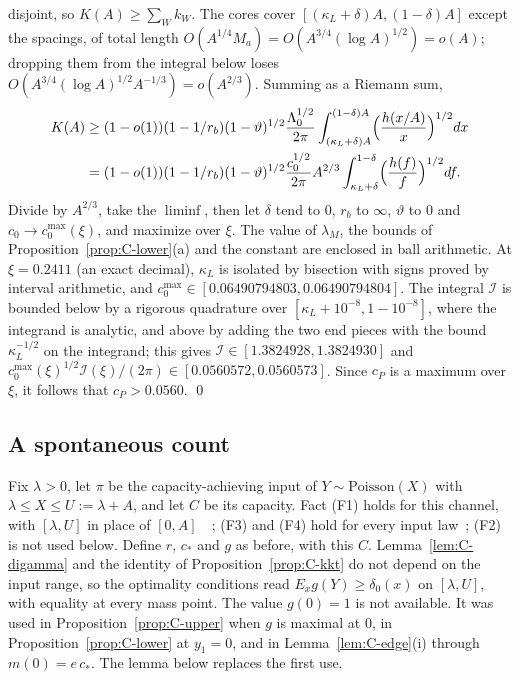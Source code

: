 \documentclass[10pt,letterpaper]{article}
\begin{document}
disjoint, so $K(A)\ge\sum_Wk_W$. The cores cover $[(\kappa_L+\delta)A,(1-\delta)A]$ except the spacings, of total length
$O(A^{1/4}M_a)=O(A^{3/4}(\log A)^{1/2})=o(A)$; dropping them from the integral below loses $O(A^{3/4}(\log A)^{1/2}A^{-1/3})=o(A^{2/3})$.
Summing as a Riemann sum,
\begin{align*}
K(A)&\ge(1-o(1))(1-1/r_b)(1-\vartheta)^{1/2}\frac{\Lambda_0^{1/2}}{2\pi}\int_{(\kappa_L+\delta)A}^{(1-\delta)A}\Bigl(\frac{h(x/A)}{x}\Bigr)^{1/2}dx\\
&=(1-o(1))(1-1/r_b)(1-\vartheta)^{1/2}\frac{c_0^{1/2}}{2\pi}A^{2/3}\int_{\kappa_L+\delta}^{1-\delta}\Bigl(\frac{h(f)}{f}\Bigr)^{1/2}df .
\end{align*}
Divide by $A^{2/3}$, take the $\liminf$, then let $\delta$ tend to $0$, $r_b$ to $\infty$, $\vartheta$ to $0$ and $c_0\to c_{0}^{\max}(\xi)$, and maximize
over $\xi$. The value of $\lambda_M$, the bounds of Proposition~\ref{prop:C-lower}(a) and the constant are enclosed in ball
arithmetic. At $\xi=0.2411$ (an exact decimal), $\kappa_L$ is isolated by bisection with signs proved by interval arithmetic, and
$c_{0}^{\max}\in[0.06490794803,0.06490794804]$. The integral $\mathcal I$ is bounded below by a rigorous quadrature over $[\kappa_L+10^{-8},1-10^{-8}]$, where the integrand is analytic, and above by
adding the two end pieces with the bound $\kappa_L^{-1/2}$ on the integrand; this gives $\mathcal I\in[1.3824928,1.3824930]$ and
$c_0^{\max}(\xi)^{1/2}\mathcal I(\xi)/(2\pi)\in[0.0560572,0.0560573]$. Since $c_P$ is a maximum over $\xi$, it follows that $c_P>0.0560$. \qed

\subsection{A spontaneous count}\label{app:C-lam}

Fix $\lambda>0$, let $\pi$ be the capacity-achieving input of $Y\sim\mathrm{Poisson}(X)$ with $\lambda\le X\le U:=\lambda+A$, and let
$C$ be its capacity. Fact (F1) holds for this channel, with $[\lambda,U]$ in place of $[0,A]$~\cite{Shamai1990}~\cite[Lemma~1]{BDS2024};
(F3) and (F4) hold for every input law~\cite[Lemma~3]{BDS2024}; (F2) is not used below. Define $r$, $c_*$ and $g$ as before, with this
$C$. Lemma~\ref{lem:C-digamma} and the identity of Proposition~\ref{prop:C-kkt} do not depend on the input range, so the optimality
conditions read $E_xg(Y)\ge\delta_0(x)$ on $[\lambda,U]$, with equality at every mass point. The value $g(0)=1$ is not available. It was
used in Proposition~\ref{prop:C-upper} when $g$ is maximal at $0$, in Proposition~\ref{prop:C-lower} at $y_1=0$, and in
Lemma~\ref{lem:C-edge}(i) through $m(0)=e\,c_*$. The lemma below replaces the first use.
\end{document}
